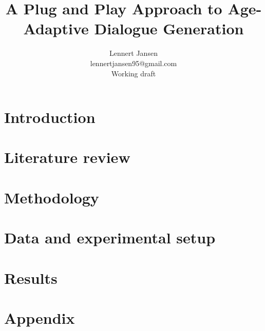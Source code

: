 \documentclass{article}
\title{A Plug and Play Approach to Age-Adaptive Dialogue Generation}
\author{%
  Lennert Jansen\\
  lennertjansen95@gmail.com \\
  Working draft
}
\begin{document}
 
\maketitle

\tableofcontents

% 

\newpage
\section{Introduction}


\section{Literature review}


\section{Methodology}



\section{Data and experimental setup}



% 

\section{Results}




\newpage



\newpage


\appendix
\section{Appendix}

\end{document}

